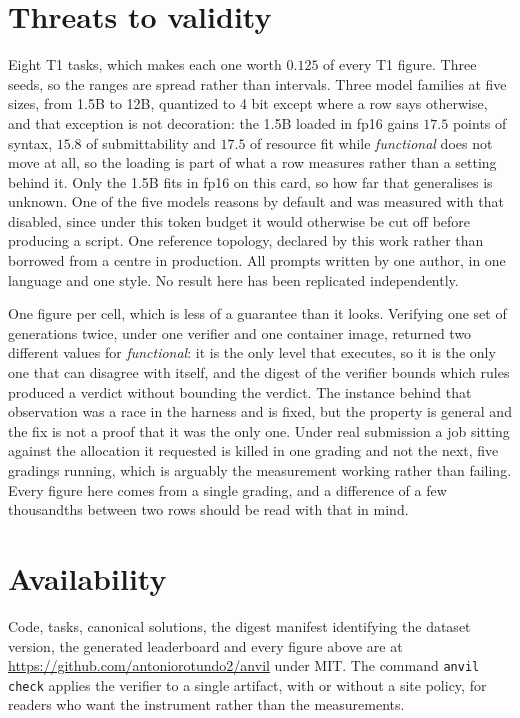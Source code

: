\documentclass[11pt,a4paper]{article}
\begin{document}
\section{Threats to validity}

Eight T1 tasks, which makes each one worth $0.125$ of every T1 figure. Three seeds, so the ranges
are spread rather than intervals. Three model families at five sizes, from 1.5B to 12B, quantized to
4 bit except where a row says otherwise, and that exception is not decoration: the 1.5B loaded in
fp16 gains $17.5$ points of syntax, $15.8$ of submittability and $17.5$ of resource fit while
\emph{functional} does not move at all, so the loading is part of what a row measures rather than a
setting behind it. Only the 1.5B fits in fp16 on this card, so how far that generalises is unknown.
One of the five models reasons by default and was measured with that disabled, since under this
token budget it would otherwise be cut off before producing a script. One reference topology,
declared by this work rather than borrowed from a centre in production. All prompts written by one
author, in one language and one style. No result here has
been replicated independently.

One figure per cell, which is less of a guarantee than it looks. Verifying one set of generations
twice, under one verifier and one container image, returned two different values for
\emph{functional}: it is the only level that executes, so it is the only one that can disagree with
itself, and the digest of the verifier bounds which rules produced a verdict without bounding the
verdict. The instance behind that observation was a race in the harness and is fixed, but the
property is general and the fix is not a proof that it was the only one. Under real submission a
job sitting against the allocation it requested is killed in one grading and not the next, five
gradings running, which is arguably the measurement working rather than failing. Every figure here
comes from a single grading, and a difference of a few thousandths between two rows should be read
with that in mind.

\section{Availability}

Code, tasks, canonical solutions, the digest manifest identifying the dataset version, the
generated leaderboard and every figure above are at
\url{https://github.com/antoniorotundo2/anvil} under MIT. The command \texttt{anvil check} applies
the verifier to a single artifact, with or without a site policy, for readers who want the
instrument rather than the measurements.



\end{document}
